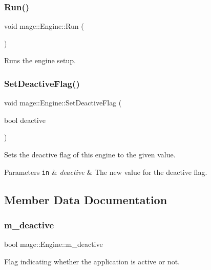 \subsubsection{\texorpdfstring{Run()}{Run()}}
{\footnotesize\ttfamily void mage\+::\+Engine\+::\+Run (\begin{DoxyParamCaption}{ }\end{DoxyParamCaption})}

Runs the engine setup. \hypertarget{classmage_1_1_engine_a942bfa9892fa79bb1068d7c7ec4e6732}{}\label{classmage_1_1_engine_a942bfa9892fa79bb1068d7c7ec4e6732} 
\subsubsection{\texorpdfstring{Set\+Deactive\+Flag()}{SetDeactiveFlag()}}
{\footnotesize\ttfamily void mage\+::\+Engine\+::\+Set\+Deactive\+Flag (\begin{DoxyParamCaption}\item[{bool}]{deactive }\end{DoxyParamCaption})}

Sets the deactive flag of this engine to the given value.


\begin{DoxyParams}[1]{Parameters}
\mbox{\tt in}  & {\em deactive} & The new value for the deactive flag. \\
\hline
\end{DoxyParams}


\subsection{Member Data Documentation}
\hypertarget{classmage_1_1_engine_ab8a4b0157403708ae7d1d018a95b4c63}{}\label{classmage_1_1_engine_ab8a4b0157403708ae7d1d018a95b4c63} 
\subsubsection{\texorpdfstring{m\+\_\+deactive}{m\_deactive}}
{\footnotesize\ttfamily bool mage\+::\+Engine\+::m\+\_\+deactive\hspace{0.3cm}{\ttfamily [private]}}

Flag indicating whether the application is active or not. \hypertarget{classmage_1_1_engine_a1dda09f0ed656180f926616a0d3f95f1}{}\label{classmage_1_1_engine_a1dda09f0ed656180f926616a0d3f95f1} 
